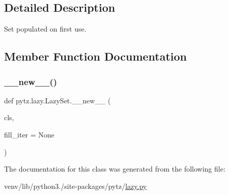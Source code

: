 \subsection{Detailed Description}
\begin{DoxyVerb}Set populated on first use.\end{DoxyVerb}
 

\subsection{Member Function Documentation}
\mbox{\label{classpytz_1_1lazy_1_1LazySet_a24d630319475ff914aeb7d6e8b2b1454}} 
\subsubsection{\texorpdfstring{\+\_\+\+\_\+new\+\_\+\+\_\+()}{\_\_new\_\_()}}
{\footnotesize\ttfamily def pytz.\+lazy.\+Lazy\+Set.\+\_\+\+\_\+new\+\_\+\+\_\+ (\begin{DoxyParamCaption}\item[{}]{cls,  }\item[{}]{fill\+\_\+iter = {\ttfamily None} }\end{DoxyParamCaption})}



The documentation for this class was generated from the following file\+:\begin{DoxyCompactItemize}
\item 
venv/lib/python3./site-\/packages/pytz/\hyperlink{lazy_8py}{lazy.\+py}\end{DoxyCompactItemize}
